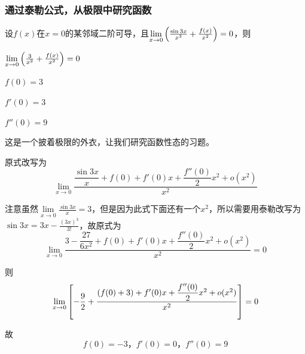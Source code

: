 \subsubsection{通过泰勒公式，从极限中研究函数}
\begin{problem}
	设$f(x)$在$x=0$的某邻域二阶可导，且$\lim\limits_{x\rightarrow 0}\qty(\frac{\sin 3x}{x^3}+\frac{f(x)}{x^2})=0$，则\xparen
	\begin{xchoices}[showanswer=true]
		\item $\lim\limits_{x\rightarrow 0}\qty(\frac{3}{x^2}+\frac{f(x)}{x^2})=0$
		\item $f(0)=3$
		\item $f'(0)=3$
		\item* $f''(0)=9$
	\end{xchoices}
    \vspace{0.5em}
    \begin{solution}
    	这是一个披着极限的外衣，让我们研究函数性态的习题。
    	
    	原式改写为$$\lim\limits_{x\rightarrow 0}\frac{\dfrac{\sin 3x}{x}+f(0)+f'(0)x+\dfrac{f''(0)}{2}x^2+o(x^2)}{x^2}$$
    	
    	注意虽然$\lim\limits_{x\rightarrow 0}\frac{\sin 3x}{x}=3$，但是因为此式下面还有一个$x^2$，所以需要用泰勒改写为$\sin 3x=3x-\frac{(3x)^3}{3!}$，故原式为$$\lim\limits_{x\rightarrow 0}\frac{3-\dfrac{27}{6x^2}+f(0)+f'(0)x+\dfrac{f''(0)}{2}x^2+o(x^2)}{x^2}=0$$
    	
    	则
    	$$\lim\limits_{x\rightarrow 0}\qty[-\frac{9}{2}+\frac{(f(0)+3)+f'(0)x+\dfrac{f''(0)}{2}x^2+o(x^2)}{x^2}]=0$$
    	
    	故$$f(0)=-3，f'(0)=0，f''(0)=9$$
    \end{solution}
\end{problem}

